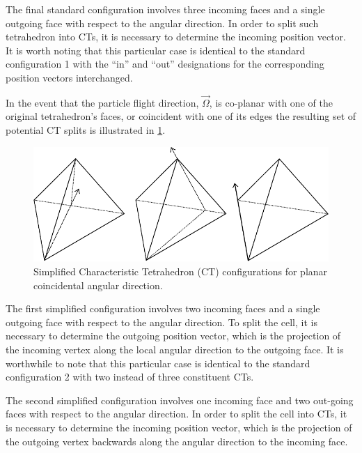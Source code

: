 The final standard configuration involves three incoming faces and a single outgoing face with respect to the angular direction.
In order to split such tetrahedron into CTs, it is necessary to determine the incoming position vector.
It is worth noting that this particular case is identical to the standard configuration 1 with the “in” and “out” designations for the corresponding position vectors interchanged.

In the event that the particle flight direction, $\vec{\Omega}$, is co-planar with one of the original tetrahedron's faces, or coincident with one of its edges the resulting set of potential CT splits is illustrated in \ref{fig:planar_CTs}.

\begin{figure}[th]
  \includegraphics[width=1.0\textwidth]{chapters/theory/figures/CT_simplified.pdf}
  \caption{Simplified Characteristic Tetrahedron (CT) configurations for planar coincidental angular direction.}
  \label{fig:planar_CTs}
\end{figure}

The first simplified configuration involves two incoming faces and a single outgoing face with respect to the angular direction.
To split the cell, it is necessary to determine the outgoing position vector, which is the projection of the incoming vertex along the local angular direction to the outgoing face.
It is worthwhile to note that this particular case is identical to the standard configuration 2 with two instead of three constituent CTs.

The second simplified configuration involves one incoming face and two out-going faces with respect to the angular direction.
In order to split the cell into CTs, it is necessary to determine the incoming position vector, which is the projection of the outgoing vertex backwards along the angular direction to the incoming face.

